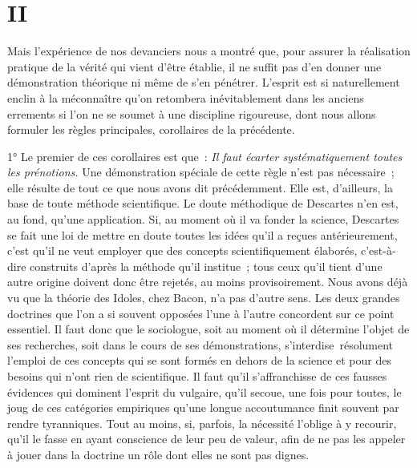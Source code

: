 \documentclass[french,twoside]{book} %
\begin{document}
\section[{II}]{II}
\noindent Mais l’expérience de nos devanciers nous a montré que, pour assurer la réalisation pratique de la vérité qui vient d’être établie, il ne suffit pas d’en donner une démonstration théorique ni même de s’en pénétrer. L’esprit est si naturellement enclin à la méconnaître qu’on retombera inévitablement dans les anciens errements si l’on ne se soumet à une discipline rigoureuse, dont nous allons formuler les règles principales, corollaires de la précédente.\par
\par
1° Le premier de ces corollaires est que : {\itshape Il faut écarter systématiquement toutes les prénotions.} Une démonstration spéciale de cette règle n’est pas nécessaire ; elle résulte de tout ce que nous avons dit précédemment. Elle est, d’ailleurs, la base de toute méthode scientifique. Le doute méthodique de Descartes n’en est, au fond, qu’une application. Si, au moment où il va fonder la science, Descartes se fait une loi de mettre en doute toutes les idées qu’il a reçues antérieurement, c’est qu’il ne veut employer que des concepts scientifiquement élaborés, c’est-à-dire construits d’après la méthode qu’il institue ; tous ceux qu’il tient d’une autre origine doivent donc être rejetés, au moins provisoirement. Nous avons déjà vu que la théorie des Idoles, chez Bacon, n’a pas d’autre sens. Les deux grandes doctrines que l’on a si souvent opposées l’une à l’autre concordent sur ce point essentiel. Il faut donc que le sociologue, soit au moment où il détermine l’objet de ses recherches, soit dans le cours de ses démonstrations, s’interdise résolument l’emploi de ces concepts qui se sont formés en dehors de la science et pour des besoins qui n’ont rien de scientifique. Il faut qu’il s’affranchisse de ces fausses évidences qui dominent l’esprit du vulgaire, qu’il secoue, une fois pour toutes, le joug de ces catégories empiriques qu’une longue accoutumance finit souvent par rendre tyranniques. Tout au moins, si, parfois, la nécessité l’oblige à y recourir, qu’il le fasse en ayant conscience de leur peu de valeur, afin de ne pas les appeler à jouer dans la doctrine un rôle dont elles ne sont pas dignes.\par
\end{document}
